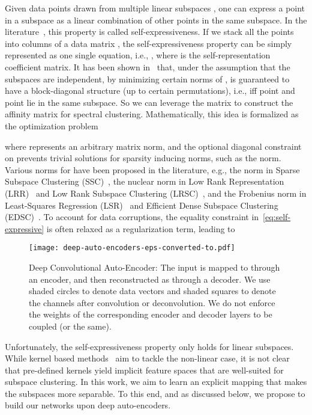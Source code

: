 \documentclass{article}
\begin{document}
Given data points  drawn from multiple linear subspaces , one can express a point in a subspace as a linear combination of other points in the same subspace. In the literature~\cite{rao2008motion,elhamifar2009sparse}, this property is called self-expressiveness. If we stack all the points  into columns of a data matrix , the self-expressiveness property can be simply represented as one single equation, i.e., , where  is the self-representation coefficient matrix. It has been shown in~\cite{ji2014efficient} that, under the assumption that the subspaces are independent, by minimizing certain norms of ,  is guaranteed to have a block-diagonal structure (up to certain permutations), i.e.,  iff point  and point  lie in the same subspace. So we can leverage the matrix  to construct the affinity matrix for spectral clustering. Mathematically, this idea is formalized as the optimization problem

where  represents an arbitrary matrix norm, and the optional diagonal constraint on  prevents trivial solutions for sparsity inducing norms, such as the  norm. Various norms for  have been proposed in the literature, e.g., the  norm in Sparse Subspace Clustering (SSC)~\cite{elhamifar2009sparse,elhamifar2013sparse}, the nuclear norm in Low Rank Representation (LRR)~\cite{liu2010robust,liu2013robust} and Low Rank Subspace Clustering (LRSC)~\cite{favaro2011closed,vidal2014low}, and the Frobenius norm in Least-Squares Regression (LSR)~\cite{lu2012robust} and Efficient Dense Subspace Clustering (EDSC)~\cite{ji2014efficient}. To account for data corruptions, the equality constraint in~\eqref{eq:self-expressive} is often relaxed as a regularization term, leading to


\begin{figure}[!t]
\centering
\hspace{-0.1cm}\texttt{[image: deep-auto-encoders-eps-converted-to.pdf]}
\caption{Deep Convolutional Auto-Encoder: The input  is mapped to  through an encoder, and then reconstructed as  through a decoder. We use shaded circles to denote data vectors and shaded squares to denote the channels after convolution or deconvolution. We do not enforce the weights of the corresponding encoder and decoder layers to be coupled (or the same).}\label{fig:dae}
\vspace{-0.3cm}
\end{figure}

Unfortunately, the self-expressiveness property only holds for linear subspaces. While kernel based methods~\cite{patel2013latent, patel2014kernel,yin2016kernel,xiao2016robust} aim to tackle the non-linear case, it is not clear that pre-defined kernels yield implicit feature spaces that are well-suited for subspace clustering.
In this work, we aim to learn an explicit mapping 
that makes the subspaces more separable. To this end, and as discussed below, we propose to build our networks upon deep auto-encoders.
\end{document}
